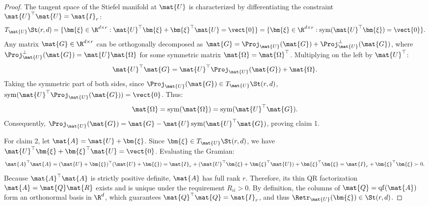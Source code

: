 \begin{proof}
The tangent space of the Stiefel manifold at $\mat{U}$ is characterized by differentiating the constraint $\mat{U}^\top \mat{U} = \mat{I}_r$:
\begin{equation}
T_{\mat{U}} \St(r, d) = \{\bm{\xi} \in \R^{d \times r} : \mat{U}^\top \bm{\xi} + \bm{\xi}^\top \mat{U} = \vect{0}\} = \{\bm{\xi} \in \R^{d \times r} : \operatorname{sym}(\mat{U}^\top \bm{\xi}) = \vect{0}\}.
\end{equation}
Any matrix $\mat{G} \in \R^{d \times r}$ can be orthogonally decomposed as $\mat{G} = \Proj_{\mat{U}}(\mat{G}) + \Proj_{\mat{U}}^\perp(\mat{G})$, where $\Proj_{\mat{U}}^\perp(\mat{G}) = \mat{U} \mat{\Omega}$ for some symmetric matrix $\mat{\Omega} = \mat{\Omega}^\top$. Multiplying on the left by $\mat{U}^\top$:
\begin{equation}
\mat{U}^\top \mat{G} = \mat{U}^\top \Proj_{\mat{U}}(\mat{G}) + \mat{\Omega}.
\end{equation}
Taking the symmetric part of both sides, since $\Proj_{\mat{U}}(\mat{G}) \in T_{\mat{U}} \St(r, d)$, $\operatorname{sym}(\mat{U}^\top \Proj_{\mat{U}}(\mat{G})) = \vect{0}$. Thus:
\begin{equation}
\mat{\Omega} = \operatorname{sym}(\mat{\Omega}) = \operatorname{sym}(\mat{U}^\top \mat{G}).
\end{equation}
Consequently, $\Proj_{\mat{U}}(\mat{G}) = \mat{G} - \mat{U} \operatorname{sym}(\mat{U}^\top \mat{G})$, proving claim 1.

For claim 2, let $\mat{A} = \mat{U} + \bm{\xi}$. Since $\bm{\xi} \in T_{\mat{U}} \St(r, d)$, we have $\mat{U}^\top \bm{\xi} + \bm{\xi}^\top \mat{U} = \vect{0}$. Evaluating the Gramian:
\begin{equation}
\mat{A}^\top \mat{A} = (\mat{U} + \bm{\xi})^\top (\mat{U} + \bm{\xi}) = \mat{I}_r + (\mat{U}^\top \bm{\xi} + \bm{\xi}^\top \mat{U}) + \bm{\xi}^\top \bm{\xi} = \mat{I}_r + \bm{\xi}^\top \bm{\xi} \succ 0.
\end{equation}
Because $\mat{A}^\top \mat{A}$ is strictly positive definite, $\mat{A}$ has full rank $r$. Therefore, its thin QR factorization $\mat{A} = \mat{Q} \mat{R}$ exists and is unique under the requirement $R_{ii} > 0$. By definition, the columns of $\mat{Q} = \operatorname{qf}(\mat{A})$ form an orthonormal basis in $\R^d$, which guarantees $\mat{Q}^\top \mat{Q} = \mat{I}_r$, and thus $\Retr_{\mat{U}}(\bm{\xi}) \in \St(r, d)$.


\end{proof}
